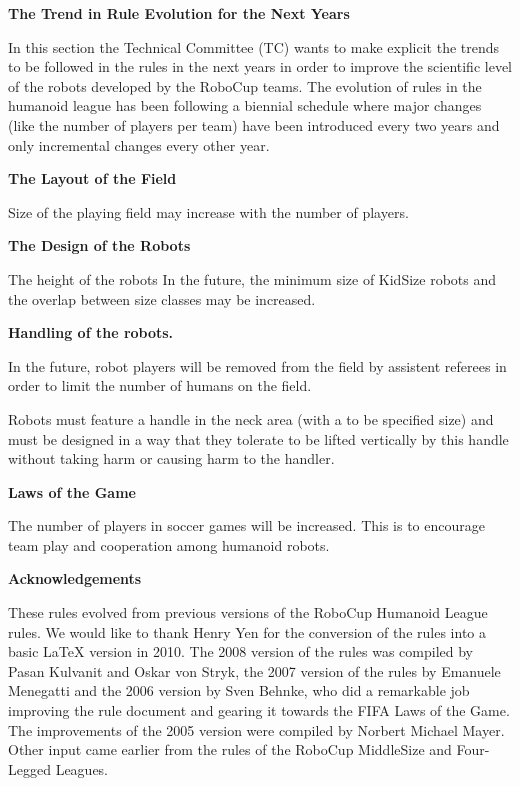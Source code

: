\clearpage
\sffamily
{\bfseries\color[rgb]{0.4,0.4,0.4}
The Trend in Rule Evolution for the Next Years }

\bigskip

In this section the Technical Committee (TC) wants to make explicit the trends to be followed in the rules in the next years in order to improve the scientific level of the robots developed by the RoboCup teams. The evolution of rules in the humanoid league has been following
a biennial schedule where major changes (like the number of players per team) have been introduced every two years and only incremental changes every other year.

\bigskip

{\bfseries The Layout of the Field}

\headlinebox

Size of the playing field may increase with the number of players.

\bigskip

{\bfseries The Design of the Robots}

\headlinebox

The height of the robots In the future, the minimum size of KidSize robots and the overlap between size classes may be increased.

\bigskip

{\bfseries Handling of the robots.}

\headlinebox

In the future, robot players will be removed from the field by assistent referees in order to limit the number of humans on the field.

Robots must feature a handle in the neck area (with a to be specified size) and must be designed in a way that they tolerate to be lifted vertically by this handle without taking harm or causing harm to the handler.

\bigskip

{\bfseries Laws of the Game}

\headlinebox

The number of players in soccer games will be increased. This is to encourage team play and cooperation among humanoid robots.

\bigskip

{\bfseries Acknowledgements}

\headlinebox

These rules evolved from previous versions of the RoboCup Humanoid League rules. We would like to thank Henry Yen for the conversion of the rules into a basic LaTeX version in 2010. The 2008 version of the rules was compiled by Pasan Kulvanit and Oskar von Stryk, the 2007 version of the rules by Emanuele Menegatti and the 2006 version by Sven Behnke, who did a remarkable job improving the rule document and gearing it towards the FIFA Laws of the Game. The improvements of the 2005 version were compiled by Norbert Michael Mayer. Other input came earlier from the rules of the RoboCup MiddleSize and Four-Legged Leagues.

